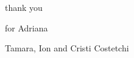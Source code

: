 
\begin{dedication} 

\centering
thank you 

\vspace{2em}
\centering
for Adriana

\vspace{1em}
Tamara, Ion and Cristi Costetchi

\end{dedication}